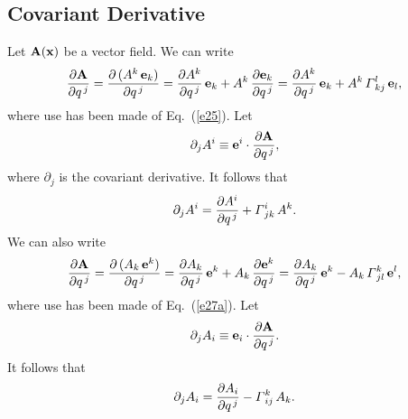 \documentclass[12pt,prb,aps,notitlepage]{revtex4-1}
\begin{document}
\subsection{Covariant Derivative}
Let ${\bf A}({\bf x})$ be a vector field. 
We can write 
\begin{equation}
\frac{\partial {\bf A}}{\partial q^{\,j}} = \frac{\partial\,(A^k\,{\bf e}_k)}{\partial q^{\,j}} = \frac{\partial A^k}{\partial q^{\,j}}\,{\bf e}_k + A^k\,\frac{\partial {\bf e}_k}{\partial q^{\,j}}= 
 \frac{\partial A^k}{\partial q^{\,j}}\,{\bf e}_k +A^k\, {\mit\Gamma}^l_{\,kj}\,{\bf e}_l,
 \end{equation}
 where use has been made of Eq.~(\ref{e25}). Let
 \begin{equation}
 \partial_j A^i \equiv  {\bf e}^i\cdot\frac{\partial{\bf A}}{\partial q^{\,j}},
 \end{equation}
 where $\partial_j$ is the covariant derivative. 
 It follows that
 \begin{equation}\label{cov1}
 \partial_j A^i = \frac{\partial A^i}{\partial q^{\,j}} + {\mit\Gamma}^i_{\,jk}\,A^k.
 \end{equation}
 We can also write 
\begin{equation}
\frac{\partial {\bf A}}{\partial q^{\,j}} = \frac{\partial\,(A_k\,{\bf e}^k)}{\partial q^{\,j}} = \frac{\partial A_k}{\partial q^{\,j}}\,{\bf e}^k + A_k\,\frac{\partial {\bf e}^k}{\partial q^{\,j}}= 
 \frac{\partial A_k}{\partial q^{\,j}}\,{\bf e}^k -A_k\, {\mit\Gamma}^k_{\,jl}\,{\bf e}^l,
 \end{equation}
 where use has been made of Eq.~(\ref{e27a}). Let
 \begin{equation}
 \partial_j A_i \equiv  {\bf e}_i\cdot\frac{\partial{\bf A}}{\partial q^{\,j}}.
 \end{equation}
 It follows that
 \begin{equation}\label{cov2}
 \partial_j A_i = \frac{\partial A_i}{\partial q^{\,j}} - {\mit\Gamma}^k_{\,ij}\,A_k.
 \end{equation}
 
\end{document}
